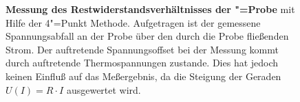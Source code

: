 \begin{figure}[htp]
\begin{center}
		\caption[Messung des Restwiderstandsverhältnisses]{{\upshape\bfseries Messung des Restwiderstandsverhältnisses der \aug"=Probe}
			mit Hilfe der 4"=Punkt Methode. Aufgetragen ist der gemessene Spannungsabfall an der
			Probe über den durch die Probe fließenden Strom. Der auftretende Spannungsoffset bei
			der Messung kommt durch auftretende Thermospannungen zustande. Dies hat jedoch keinen
			Einfluß auf das Meßergebnis, da die Steigung der Geraden $U(I)=R\cdot I$ ausgewertet
			wird.}
		\label{fig:rrr}
	\end{center}
\end{figure}

